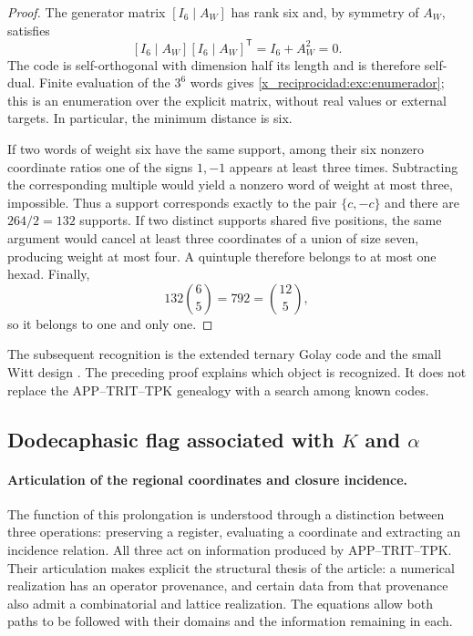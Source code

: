 \begin{proof}
The generator matrix $[I_6\mid A_W]$ has rank six and, by symmetry
of $A_W$, satisfies
\[
 [I_6\mid A_W][I_6\mid A_W]^{\mathsf T}
   =I_6+A_W^2=0.
\]
The code is self-orthogonal with dimension half its length and is therefore
self-dual. Finite evaluation of the $3^6$ words gives
\eqref{x_reciprocidad:exc:enumerador}; this is an enumeration over the explicit matrix,
without real values or external targets. In particular, the minimum
distance is six.

If two words of weight six have the same support, among their six
nonzero coordinate ratios one of the signs $1,-1$ appears at
least three times. Subtracting the corresponding multiple would yield
a nonzero word of weight at most three, impossible. Thus a support
corresponds exactly to the pair $\{c,-c\}$ and there are $264/2=132$
supports. If two distinct supports shared five positions,
the same argument would cancel at least three coordinates of a union
of size seven, producing weight at most four. A
quintuple therefore belongs to at most one hexad. Finally,
\[
 132\binom65=792=\binom{12}5,
\]
so it belongs to one and only one.
\end{proof}

The subsequent recognition is the extended ternary Golay code and
the small Witt design \cite{x_reciprocidad:conwaysloane}. The preceding proof explains which object is
recognized. It does not replace the APP--TRIT--TPK genealogy with a search
among known codes.

\subsection{Dodecaphasic flag associated with \texorpdfstring{$K$ and $\alpha$}{K and alpha}}
\label{x_reciprocidad:exc:bandera}


\paragraph{Articulation of the regional coordinates and closure incidence.}
\label{x_reciprocidad:inc-ampl-articulacion}
The function of this prolongation is understood through a distinction
between three operations: preserving a register, evaluating a coordinate and
extracting an incidence relation. All three act on information
produced by APP--TRIT--TPK. Their articulation makes explicit the structural
thesis of the article: a numerical realization has an operator
provenance, and certain data from that provenance also admit a
combinatorial and lattice realization. The equations allow both
paths to be followed with their domains and the information remaining in each.

